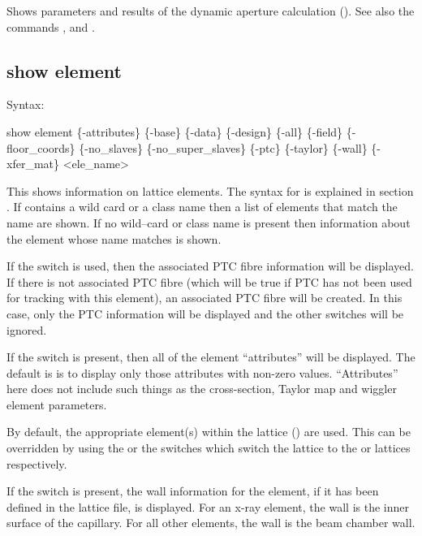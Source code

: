 {{{{{{{{Shows parameters and results of the dynamic aperture calculation ().
See also the commands , and .


\subsection{show element}
\label{s:show.element}

Syntax:
\begin{example}
  show element \{-attributes\} \{-base\} \{-data\} \{-design\} \{-all\} \{-field\}
      \{-floor_coords\} \{-no_slaves\} \{-no_super_slaves\} \{-ptc\} \{-taylor\} \{-wall\} 
      \{-xfer_mat\} <ele_name>
\end{example}

This shows information on lattice elements. The syntax for  is explained in section
. If  contains a wild card or a class name then a list of
elements that match the name are shown. If no wild--card or class name is present then information
about the element whose name matches  is shown.

If the  switch is used, then the associated PTC fibre information will be displayed. If
there is not associated PTC fibre (which will be true if PTC has not been used for tracking with
this element), an associated PTC fibre will be created. In this case, only the PTC information will
be displayed and the other switches will be ignored.

If the  switch is present, then all of the element ``attributes'' will be
displayed. The default is is to display only those attributes with non-zero values. ``Attributes''
here does not include such things as the cross-section, Taylor map and wiggler element parameters.

By default, the appropriate element(s) within the  lattice () are
used. This can be overridden by using the  or the  switches which switch the
lattice to the  or  lattices respectively.

If the  switch is present, the wall information for the element, if it has been defined in
the lattice file, is displayed. For an x-ray  element, the wall is the inner surface
of the capillary. For all other elements, the wall is the beam chamber wall.

}}}}}}}}
